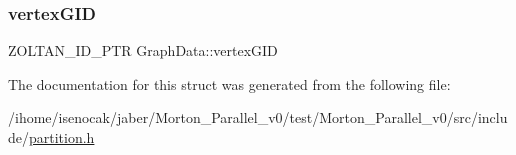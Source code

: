 \mbox{\label{structGraphData_a145c72abf18fbaf01b69eac638fa8438}} 
\subsubsection{\texorpdfstring{vertex\+G\+ID}{vertexGID}}
{\footnotesize\ttfamily Z\+O\+L\+T\+A\+N\+\_\+\+I\+D\+\_\+\+P\+TR Graph\+Data\+::vertex\+G\+ID}



The documentation for this struct was generated from the following file\+:\begin{DoxyCompactItemize}
\item 
/ihome/isenocak/jaber/\+Morton\+\_\+\+Parallel\+\_\+v0/test/\+Morton\+\_\+\+Parallel\+\_\+v0/src/include/\mbox{\hyperlink{partition_8h}{partition.\+h}}\end{DoxyCompactItemize}
